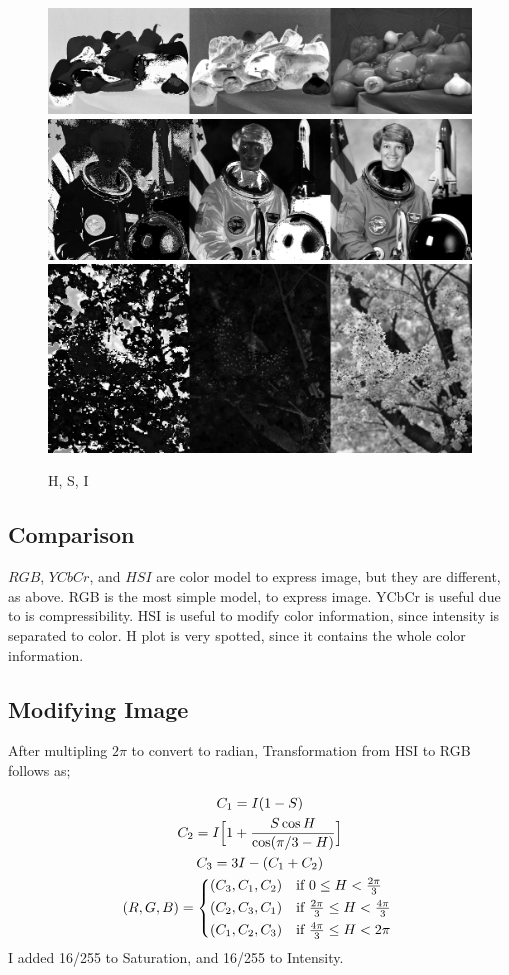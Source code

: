 \documentclass{article}
\begin{document}
\begin{figure}[h]
    \centering
    \includegraphics[width=.4\textwidth]{fig/HSI_peppers.png}  \\
    \includegraphics[width=.4\textwidth]{fig/HSI_astronaut.png}  \\
    \includegraphics[width=.4\textwidth]{fig/HSI_cb.png}
    \caption{H, S, I}
\end{figure}

\subsection{Comparison}
$RGB$, $YCbCr$, and $HSI$ are color model to express image, but they are different, as above.
RGB is the most simple model, to express image.
YCbCr is useful due to is compressibility. 
HSI is useful to modify color information, since intensity is separated to color. H plot is very spotted, since it contains the whole color information.

\newpage
\subsection{Modifying Image}
After multipling $2\pi$ to convert to radian, Transformation from HSI to RGB follows as;  

\begin{gather*}
    C_1 = I(1-S)  \\
    C_2 = I \Big[ 1 + \frac{S \cos H}{\cos(\pi/3 - H)} \Big]  \\
    C_3 = 3I - (C_1 + C_2) \\
    (R, G, B) =
    \begin{dcases*}
        (C_3, C_1, C_2) & if $0 \leq H < \frac{2\pi}{3}$ \\
        (C_2, C_3, C_1) & if $\frac{2\pi}{3} \leq H < \frac{4\pi}{3}$ \\
        (C_1, C_2, C_3) & if $\frac{4\pi}{3} \leq H < 2\pi$
    \end{dcases*}
\end{gather*}
I added 16/255 to Saturation, and 16/255 to Intensity. 
\end{document}
